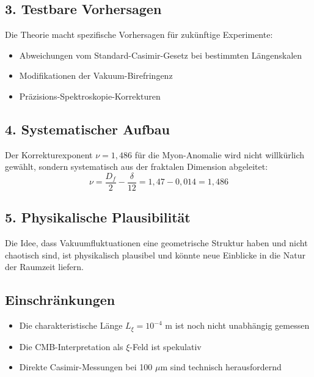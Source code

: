 \documentclass[12pt,a4paper]{article}
\begin{document}
		\subsection{3. Testbare Vorhersagen}
		
		Die Theorie macht spezifische Vorhersagen f\"ur zuk\"unftige Experimente:
		\begin{itemize}
			\item Abweichungen vom Standard-Casimir-Gesetz bei bestimmten L\"angenskalen
			\item Modifikationen der Vakuum-Birefringenz
			\item Pr\"azisions-Spektroskopie-Korrekturen
		\end{itemize}
		
		\subsection{4. Systematischer Aufbau}
		
		Der Korrekturexponent $\nu = 1{,}486$ f\"ur die Myon-Anomalie wird nicht willk\"urlich gew\"ahlt, sondern systematisch aus der fraktalen Dimension abgeleitet:
		\begin{equation}
			\nu = \frac{D_f}{2} - \frac{\delta}{12} = 1{,}47 - 0{,}014 = 1{,}486
		\end{equation}
		
		\subsection{5. Physikalische Plausibilit\"at}
		
		Die Idee, dass Vakuumfluktuationen eine geometrische Struktur haben und nicht chaotisch sind, ist physikalisch plausibel und k\"onnte neue Einblicke in die Natur der Raumzeit liefern.
		
		\subsection{Einschr\"ankungen}
		
		\begin{itemize}
			\item Die charakteristische L\"ange $L_\xi = 10^{-4}$ m ist noch nicht unabh\"angig gemessen
			\item Die CMB-Interpretation als $\xi$-Feld ist spekulativ
			\item Direkte Casimir-Messungen bei 100 $\mu$m sind technisch herausfordernd
		\end{itemize}
\end{document}
